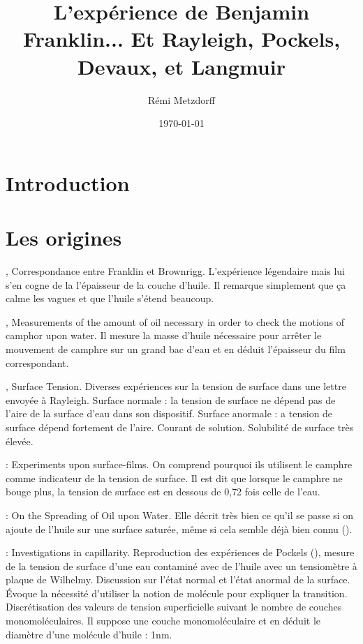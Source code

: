 \documentclass[12pt,a4paper]{article}
\title{L'expérience de Benjamin Franklin... Et Rayleigh, Pockels, Devaux, et Langmuir}
\author{Rémi Metzdorff}
\date{\today}
\begin{document}
\maketitle

\tableofcontents
\newpage

\section*{Introduction}

\section{Les origines}

\cite{Franklin1773a}, Correspondance entre Franklin et Brownrigg.
L'expérience légendaire mais lui s'en cogne de la l'épaisseur de la couche d'huile.
Il remarque simplement que ça calme les vagues et que l'huile s'étend beaucoup.

\cite{Rayleigh1890a}, Measurements of the amount of oil necessary in order to check the motions of camphor upon water.
Il mesure la masse d'huile nécessaire pour arrêter le mouvement de camphre sur un grand bac d'eau et en déduit l'épaisseur du film correspondant.

\cite{Pockels1891}, Surface Tension.
Diverses expériences sur la tension de surface dans une lettre envoyée à Rayleigh.
Surface normale : la tension de surface ne dépend pas de l'aire de la surface d'eau dans son dispositif.
Surface anormale : a tension de surface dépend fortement de l'aire.
Courant de solution.
Solubilité de surface très élevée.

\cite{Rayleigh1892} : Experiments upon surface-films.
On comprend pourquoi ils utilisent le camphre comme indicateur de la tension de surface.
Il est dit que lorsque le camphre ne bouge plus, la tension de surface est en dessous de 0{,}72 fois celle de l'eau. 

\cite{Pockels1894} : On the Spreading of Oil upon Water.
Elle décrit très bien ce qu'il se passe si on ajoute de l'huile sur une surface saturée, même si cela semble déjà bien connu (\cite{Rayleigh1892}).

\cite{Rayleigh1899} : Investigations in capillarity.
Reproduction des expériences de Pockels (\cite{Pockels1891}), mesure de la tension de surface d'une eau contaminé avec de l'huile avec un tensiomètre à plaque de Wilhelmy.
Discussion sur l'état normal et l'état anormal de la surface.
Évoque la nécessité d'utiliser la notion de molécule pour expliquer la transition.
Discrétisation des valeurs de tension superficielle suivant le nombre de couches monomoléculaires.
Il suppose une couche monomoléculaire et en déduit le diamètre d'une molécule d'huile : \unit{1}{nm}.
\end{document}
